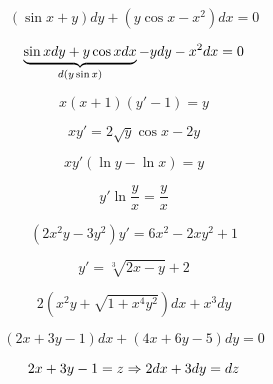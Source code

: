 \documentclass[12pt, fleqn]{article}
\begin{document}
\begin{Proof}

\end{Proof}

\begin{Example}[333]
  \[(\sin x + y) dy + (y \cos x - x^2) dx = 0\]
\end{Example}

\begin{Proof}
  \[\ub{d(y \sin x)}{\sin x dy + y \cos x dx} - y dy - x^2 dx = 0\]
\end{Proof}

\begin{Example}[338]
  \[x(x+1)(y'-1) = y\]
\end{Example}

\begin{Example}[349]
  \[xy' = 2 \sqrt y \cos x - 2y\]
\end{Example}

\begin{Proof}

\end{Proof}

\begin{Example}[359]
  \[xy'(\ln y - \ln x) = y\]
\end{Example}

\begin{Proof}[однородное]
  \[y' \ln \dfrac{y}{x} = \dfrac{y}{x}\]
\end{Proof}

\begin{Example}[361]
  \[(2x^2 y - 3y^2)y' = 6x^2 - 2xy^2 +1\]
\end{Example}

\begin{Example}[368]
  \[y' = \sqrt[3]{2x - y} + 2\]
\end{Example}

\begin{Example}[371]
  \[2(x^2 y + \sqrt{1 + x^4 y^2}) dx + x^3 dy\]
\end{Example}

\begin{Example}[374]
  \[(2x+3y-1)dx + (4x + 6y - 5)dy = 0\]
\end{Example}

\begin{Proof}
  \[2x + 3y - 1 = z \Ra 2dx + 3dy = dz\]
\end{Proof}
\end{document}
